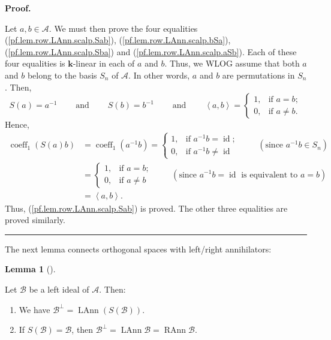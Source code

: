 \documentclass[numbers=enddot,12pt,final,onecolumn,notitlepage]{scrartcl}%
\numberwithin{exer}{subsection}
\theoremstyle{definition}
\newtheorem{lem}[theo]{Lemma}
\newenvironment{lemma}[1][]
{\begin{lem}[#1]\begin{leftbar}}
{\end{leftbar}\end{lem}}
\newenvironment{proof}[1][Proof]{\noindent\textbf{#1.} }{\ \rule{0.5em}{0.5em}}
\newenvironment{verlong}{}{}
\begin{document}
\begin{verlong}


\begin{proof}


\item[Proof of Lemma \ref{lem.coeff1-form} \textbf{(a)}.] Let $a,b\in
\mathcal{A}$. We must then prove the four equalities
(\ref{pf.lem.row.LAnn.scalp.Sab}), (\ref{pf.lem.row.LAnn.scalp.bSa}),
(\ref{pf.lem.row.LAnn.scalp.Sba}) and (\ref{pf.lem.row.LAnn.scalp.aSb}). Each
of these four equalities is $\mathbf{k}$-linear in each of $a$ and $b$. Thus,
we WLOG assume that both $a$ and $b$ belong to the basis $S_{n}$ of
$\mathcal{A}$. In other words, $a$ and $b$ are permutations in $S_{n}$. Then,%
\[
S\left(  a\right)  =a^{-1}\ \ \ \ \ \ \ \ \ \ \text{and}%
\ \ \ \ \ \ \ \ \ \ S\left(  b\right)  =b^{-1}\ \ \ \ \ \ \ \ \ \ \text{and}%
\ \ \ \ \ \ \ \ \ \ \left\langle a,b\right\rangle =%
\begin{cases}
1, & \text{if }a=b;\\
0, & \text{if }a\neq b.
\end{cases}
\]
Hence,
\begin{align*}
\operatorname*{coeff}\nolimits_{1}\left(  S\left(  a\right)  b\right)   &
=\operatorname*{coeff}\nolimits_{1}\left(  a^{-1}b\right)  =%
\begin{cases}
1, & \text{if }a^{-1}b=\operatorname*{id};\\
0, & \text{if }a^{-1}b\neq\operatorname*{id}%
\end{cases}
\ \ \ \ \ \ \ \ \ \ \left(  \text{since }a^{-1}b\in S_{n}\right) \\
&  =%
\begin{cases}
1, & \text{if }a=b;\\
0, & \text{if }a\neq b
\end{cases}
\ \ \ \ \ \ \ \ \ \ \left(  \text{since }a^{-1}b=\operatorname*{id}\text{ is
equivalent to }a=b\right) \\
&  =\left\langle a,b\right\rangle .
\end{align*}
Thus, (\ref{pf.lem.row.LAnn.scalp.Sab}) is proved. The other three equalities
are proved similarly.
\end{proof}
\end{verlong}

The next lemma connects orthogonal spaces with left/right annihilators:

\begin{lemma}
\label{lem.row.LAnn}Let $\mathcal{B}$ be a left ideal of $\mathcal{A}$. Then:

\begin{enumerate}
\item[\textbf{(a)}] We have $\mathcal{B}^{\perp}=\operatorname*{LAnn}\left(
S\left(  \mathcal{B}\right)  \right)  $.

\item[\textbf{(b)}] If $S\left(  \mathcal{B}\right)  =\mathcal{B}$, then
$\mathcal{B}^{\perp}=\operatorname*{LAnn}\mathcal{B}=\operatorname*{RAnn}%
\mathcal{B}$.
\end{enumerate}
\end{lemma}
\end{document}
